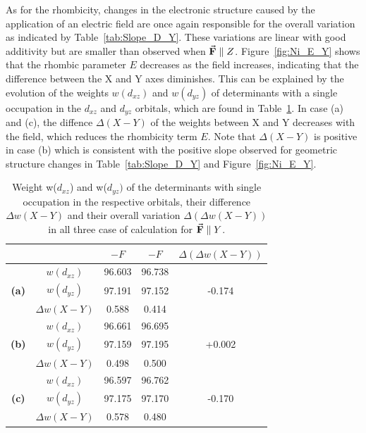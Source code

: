 \documentclass[12pt]{report}
\numberwithin{equation}{section}
\begin{document}
As for the rhombicity, changes in the electronic structure caused by the application of an electric field are once again responsible for the overall variation as indicated by Table~\ref{tab:Slope_D_Y}.
These variations are linear with good additivity but are smaller than observed when $\vec{\vb{F}}\parallel Z$. 
Figure~\ref{fig:Ni_E_Y} shows that the rhombic parameter $E$ decreases as the field increases, indicating that the difference between the X and Y axes diminishes.
This can be explained by the evolution of the weights $w(d_{xz})$ and $w(d_{yz})$ of determinants with a single occupation in the $d_{xz}$ and $d_{yz}$ orbitals, which are found in Table~\ref{tab:PoidsY}.
In case (a) and (c), the diffence $\Delta (X-Y)$ of the weights between X and Y decreases with the field, which reduces the rhombicity term $E$.
Note that $\Delta (X-Y)$ is positive in case (b) which is consistent with the positive slope observed for geometric structure changes in Table~\ref{tab:Slope_D_Y} and Figure~\ref{fig:Ni_E_Y}.


\begin{table}[h]
    \centering
    \begin{tabular}{c | c | c c | c }
        & &  $-F$ & $-F$ & $\Delta (\Delta w(X-Y))$\\
        \hline
        \multirow{3}{*}{\textbf{(a)}}
        &$w(d_{xz})$ &  96.603 & 96.738 & \\
        &$w(d_{yz})$ &  97.191 & 97.152 & -0.174\\
        &$\Delta w(X-Y)$ & 0.588 & 0.414& \\
        \hline
        \multirow{3}{*}{\textbf{(b)}}
        &$w(d_{xz})$ &  96.661 & 96.695 & \\
        &$w(d_{yz})$ &  97.159 & 97.195 & +0.002\\
        &$\Delta w(X-Y)$ & 0.498 & 0.500& \\
        \hline
        \multirow{3}{*}{\textbf{(c)}}
        &$w(d_{xz})$ &  96.597 & 96.762 & \\
        &$w(d_{yz})$ &  97.175 & 97.170 & -0.170\\
        &$\Delta w(X-Y)$ & 0.578 & 0.480& \\
        \hline
    \end{tabular}
    \caption{Weight w($d_{xz}$) and w($d_{yz})$ of the determinants with single occupation in the respective orbitals, their difference $\Delta w(X-Y)$ and their overall variation $\Delta (\Delta w(X-Y))$ in all three case of calculation for $\vec{\vb{F}}\parallel Y$.}
    \label{tab:PoidsY}
\end{table}
\end{document}
